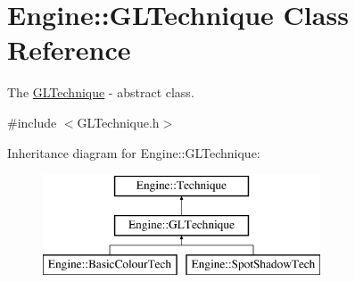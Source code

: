 \hypertarget{classEngine_1_1GLTechnique}{}\section{Engine\+:\+:G\+L\+Technique Class Reference}
\label{classEngine_1_1GLTechnique}


The \hyperlink{classEngine_1_1GLTechnique}{G\+L\+Technique} -\/ abstract class.  




{\ttfamily \#include $<$G\+L\+Technique.\+h$>$}

Inheritance diagram for Engine\+:\+:G\+L\+Technique\+:\begin{figure}[H]
\begin{center}
\leavevmode
\includegraphics[height=3.000000cm]{classEngine_1_1GLTechnique}
\end{center}
\end{figure}
